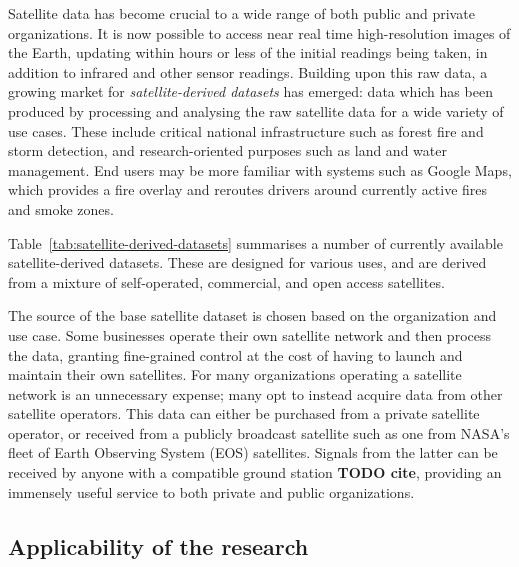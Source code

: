 Satellite data has become crucial to a wide range of both public and private organizations.
It is now possible to access near real time high-resolution images of the Earth, updating within hours or less of the initial readings being taken, in addition to infrared and other sensor readings.
Building upon this raw data, a growing market for \textit{satellite-derived datasets} has emerged: data which has been produced by processing and analysing the raw satellite data for a wide variety of use cases. %
These include critical national infrastructure such as forest fire and storm detection, and research-oriented purposes such as land and water management.
End users may be more familiar with systems such as Google Maps, which provides a fire overlay and reroutes drivers around currently active fires and smoke zones.

Table~\ref{tab:satellite-derived-datasets} summarises a number of currently available satellite-derived datasets.
These are designed for various uses, and are derived from a mixture of self-operated, commercial, and open access satellites.

The source of the base satellite dataset is chosen based on the organization and use case.
Some businesses operate their own satellite network and then process the data, granting fine-grained control at the cost of having to launch and maintain their own satellites.
For many organizations operating a satellite network is an unnecessary expense; many opt to instead acquire data from other satellite operators.
This data can either be purchased from a private satellite operator, or received from a publicly broadcast satellite such as one from NASA's fleet of Earth Observing System (EOS) satellites.
Signals from the latter can be received by anyone with a compatible ground station \textbf{TODO cite}, providing an immensely useful service to both private and public organizations.



\subsection{Applicability of the research}

